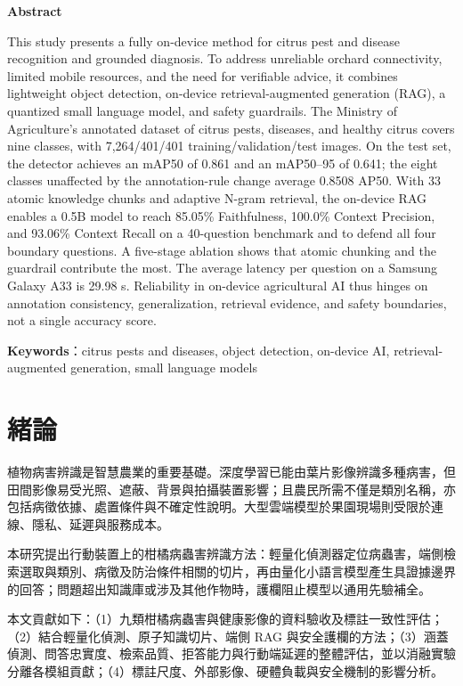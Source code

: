 \documentclass[10pt,twocolumn,a4paper]{article}
\begin{document}
\begin{center}\bfseries\fontsize{12}{18}\selectfont Abstract\end{center}
{\noindent This study presents a fully on-device method for citrus pest and disease recognition and grounded diagnosis. To address unreliable orchard connectivity, limited mobile resources, and the need for verifiable advice, it combines lightweight object detection, on-device retrieval-augmented generation (RAG), a quantized small language model, and safety guardrails. The Ministry of Agriculture's annotated dataset of citrus pests, diseases, and healthy citrus covers nine classes, with 7,264/401/401 training/validation/test images. On the test set, the detector achieves an mAP50 of 0.861 and an mAP50–95 of 0.641; the eight classes unaffected by the annotation-rule change average 0.8508 AP50. With 33 atomic knowledge chunks and adaptive N-gram retrieval, the on-device RAG enables a 0.5B model to reach 85.05\% Faithfulness, 100.0\% Context Precision, and 93.06\% Context Recall on a 40-question benchmark and to defend all four boundary questions. A five-stage ablation shows that atomic chunking and the guardrail contribute the most. The average latency per question on a Samsung Galaxy A33 is 29.98 s. Reliability in on-device agricultural AI thus hinges on annotation consistency, generalization, retrieval evidence, and safety boundaries, not a single accuracy score.

\vspace{6pt}\noindent\textbf{Keywords}：citrus pests and diseases, object detection, on-device AI, retrieval-augmented generation, small language models\par}

\section{緒論}
植物病害辨識是智慧農業的重要基礎。深度學習已能由葉片影像辨識多種病害\cite{mohanty2016,ferentinos2018,kamilaris2018,pacal2024}，但田間影像易受光照、遮蔽、背景與拍攝裝置影響；且農民所需不僅是類別名稱，亦包括病徵依據、處置條件與不確定性說明。大型雲端模型於果園現場則受限於連線、隱私、延遲與服務成本。

本研究提出行動裝置上的柑橘病蟲害辨識方法：輕量化偵測器定位病蟲害，端側檢索選取與類別、病徵及防治條件相關的切片，再由量化小語言模型產生具證據邊界的回答；問題超出知識庫或涉及其他作物時，護欄阻止模型以通用先驗補全。

本文貢獻如下：（1）九類柑橘病蟲害與健康影像的資料驗收及標註一致性評估；（2）結合輕量化偵測、原子知識切片、端側 RAG 與安全護欄的方法；（3）涵蓋偵測、問答忠實度、檢索品質、拒答能力與行動端延遲的整體評估，並以消融實驗分離各模組貢獻；（4）標註尺度、外部影像、硬體負載與安全機制的影響分析。
\end{document}
